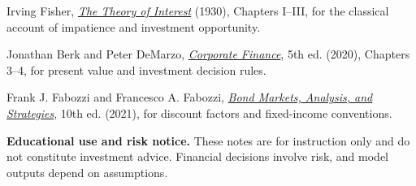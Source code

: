 \documentclass[11pt]{article}
\begin{document}
\begin{readinglist}
  \item Irving Fisher, \href{https://oll.libertyfund.org/titles/fisher-the-theory-of-interest}{\emph{The Theory of Interest}} (1930), Chapters I--III, for the classical account of impatience and investment opportunity.
  \item Jonathan Berk and Peter DeMarzo, \href{https://www.pearson.com/en-gb/subject-catalog/p/Berk-Corporate-Finance-Global-Edition-5th-Edition/P200000003710}{\emph{Corporate Finance}}, 5th ed. (2020), Chapters 3--4, for present value and investment decision rules.
  \item Frank J. Fabozzi and Francesco A. Fabozzi, \href{https://mitpress.mit.edu/9780262046275/bond-markets-analysis-and-strategies/}{\emph{Bond Markets, Analysis, and Strategies}}, 10th ed. (2021), for discount factors and fixed-income conventions.
\end{readinglist}

\vfill
{\sffamily\footnotesize\color{vnmuted}\textbf{Educational use and risk notice.} These notes are for instruction only and do not constitute investment advice. Financial decisions involve risk, and model outputs depend on assumptions.}
\end{document}
